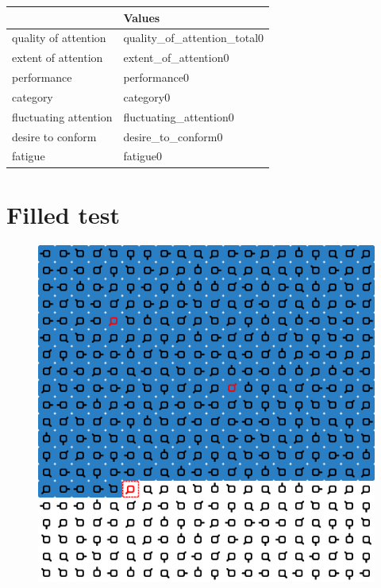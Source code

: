 \documentclass[12pt,a4paper]{article}
\begin{document}
\begin{table}[htbp]
\footnotesize

\begin{tabulary}{\linewidth}{|L|L|}
\hline
 &  Values  \\
\hline
quality of attention & quality_of_attention_total0 \\
\hline
extent of attention & extent_of_attention0 \\
\hline
performance & performance0  \\
\hline
category & category0  \\
\hline
fluctuating attention & fluctuating_attention0  \\
\hline
desire to conform & desire_to_conform0  \\
\hline
fatigue & fatigue0  \\
\hline
\end{tabulary}
\label{tab:team}
\end{table}%

\textblockorigin{-18pt}{-2pt}

\newpage

\section*{Filled test}


\begin{figure}[!h]
    \centering
    \includegraphics[scale=0.4]{CodeToGiveApp/data/temp/kitoltott.png}
\end{figure}
\end{document}
